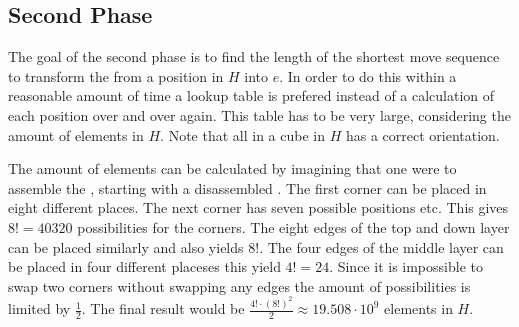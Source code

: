 \subsection{Second Phase}
\label{sub:secondPhase}
The goal of the second phase is to find the length of the shortest move sequence to transform the \rubik from a position in $H$ into $e$. In order to do this within a reasonable amount of time a lookup table is prefered instead of a calculation of each position over and over again. This table has to be very large, considering the amount of elements in $H$. Note that all \cpiece{} in a cube in $H$ has a correct orientation. 

The amount of elements can be calculated by imagining that one were to assemble the \rubik{}, starting with a disassembled \rubik{}. The first corner \cpiece{} can be placed in eight different places. The next corner has seven possible positions etc. 
This gives $8! = 40320$ possibilities for the corners. The eight edges of the top and down layer can be placed similarly and also yields $8!$.  The four edges of the middle layer can be placed in four different placeses this yield $4! = 24$. Since it is impossible to swap two corners without swapping any edges the amount of possibilities is limited by $\frac{1}{2}$. The final result would be $\frac{4!\cdot(8!)^{2}}{2} \approx 19.508\cdot10^{9}$ elements in $H$.

 